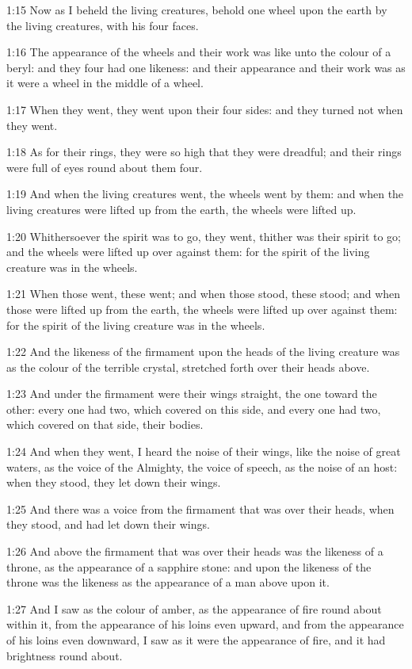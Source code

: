 1:15 Now as I beheld the living creatures, behold one wheel upon the earth by the living creatures, with his four faces.

1:16 The appearance of the wheels and their work was like unto the colour of a beryl: and they four had one likeness: and their appearance and their work was as it were a wheel in the middle of a wheel.

1:17 When they went, they went upon their four sides: and they turned not when they went.

1:18 As for their rings, they were so high that they were dreadful; and their rings were full of eyes round about them four.

1:19 And when the living creatures went, the wheels went by them: and when the living creatures were lifted up from the earth, the wheels were lifted up.

1:20 Whithersoever the spirit was to go, they went, thither was their spirit to go; and the wheels were lifted up over against them: for the spirit of the living creature was in the wheels.

1:21 When those went, these went; and when those stood, these stood; and when those were lifted up from the earth, the wheels were lifted up over against them: for the spirit of the living creature was in the wheels.

1:22 And the likeness of the firmament upon the heads of the living creature was as the colour of the terrible crystal, stretched forth over their heads above.

1:23 And under the firmament were their wings straight, the one toward the other: every one had two, which covered on this side, and every one had two, which covered on that side, their bodies.

1:24 And when they went, I heard the noise of their wings, like the noise of great waters, as the voice of the Almighty, the voice of speech, as the noise of an host: when they stood, they let down their wings.

1:25 And there was a voice from the firmament that was over their heads, when they stood, and had let down their wings.

1:26 And above the firmament that was over their heads was the likeness of a throne, as the appearance of a sapphire stone: and upon the likeness of the throne was the likeness as the appearance of a man above upon it.

1:27 And I saw as the colour of amber, as the appearance of fire round about within it, from the appearance of his loins even upward, and from the appearance of his loins even downward, I saw as it were the appearance of fire, and it had brightness round about.

